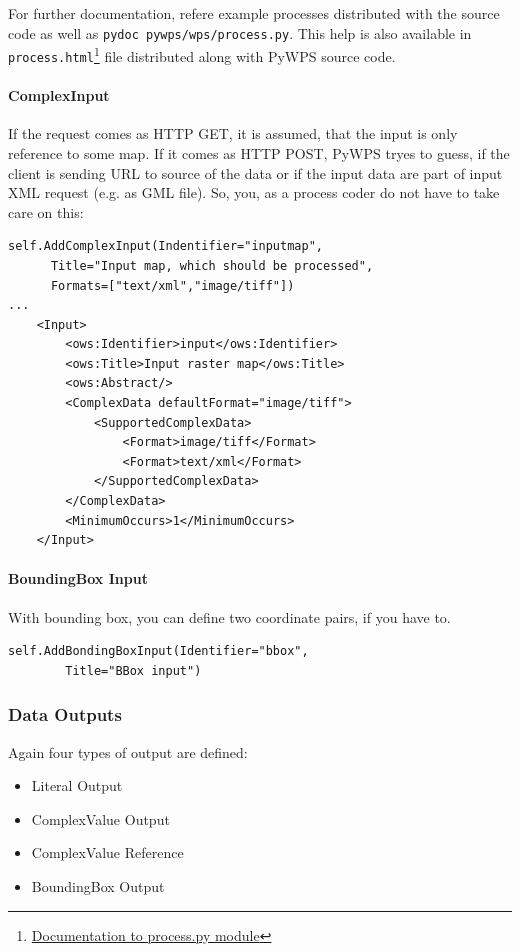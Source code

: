\documentclass[a4paper,11pt]{article}
\begin{document}
For further documentation, refere example processes distributed with the
source code as well as \texttt{pydoc~pywps/wps/process.py}. This help is
also available in
\texttt{process.html}\footnote{\href{http://wald.intevation.org/plugins/scmsvn/viewcvs.php/*checkout*/trunk/doc/process.html?rev=369&root=pywps}{Documentation
to process.py module}} file distributed along with PyWPS
source code.

\paragraph{ComplexInput}
If the request comes as HTTP GET, it is assumed, that the input is only
reference to some map. If it comes as HTTP POST, PyWPS tryes to guess, if
the client is sending URL to source of the data or if the input data are
part of input XML request (e.g. as GML file). So, you, as a process coder
do not have to take care on this:

\begin{verbatim}
self.AddComplexInput(Indentifier="inputmap",
      Title="Input map, which should be processed",
      Formats=["text/xml","image/tiff"])
...
    <Input>
        <ows:Identifier>input</ows:Identifier>
        <ows:Title>Input raster map</ows:Title>
        <ows:Abstract/>
        <ComplexData defaultFormat="image/tiff">
            <SupportedComplexData>
                <Format>image/tiff</Format>
                <Format>text/xml</Format>
            </SupportedComplexData>
        </ComplexData>
        <MinimumOccurs>1</MinimumOccurs>
    </Input>
\end{verbatim}

\paragraph{BoundingBox Input}
With bounding box, you can define two coordinate pairs, if you have to.

\begin{verbatim}
self.AddBondingBoxInput(Identifier="bbox",
        Title="BBox input")
\end{verbatim}

\subsubsection{Data Outputs}
Again four types of output are defined:
\begin{itemize}
    \item Literal Output
    \item ComplexValue Output
    \item ComplexValue Reference
    \item BoundingBox Output
\end{itemize}
    
\end{document}
